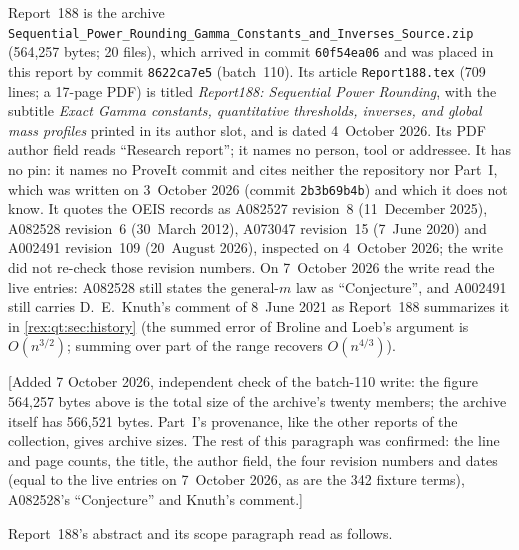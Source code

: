 Report~188 is the archive
\nolinkurl{Sequential_Power_Rounding_Gamma_Constants_and_Inverses_Source.zip}
(564,257 bytes; 20 files), which arrived in commit \texttt{60f54ea06} and
was placed in this report by commit \texttt{8622ca7e5} (batch~110). Its
article \texttt{Report188.tex} (709 lines; a 17-page PDF) is titled
\emph{Report188: Sequential Power Rounding}, with the subtitle
\emph{Exact Gamma constants, quantitative thresholds, inverses, and global
mass profiles} printed in its author slot, and is dated 4~October 2026. Its
PDF author field reads ``Research report''; it names no person, tool or
addressee. It has no pin: it names no ProveIt commit and cites neither the
repository nor Part~I, which was written on 3~October 2026 (commit
\texttt{2b3b69b4b}) and which it does not know. It quotes the OEIS records
as A082527 revision~8 (11~December 2025), A082528 revision~6
(30~March 2012), A073047 revision~15 (7~June 2020) and A002491
revision~109 (20~August 2026), inspected on 4~October 2026; the write
did not re-check those revision numbers. On 7~October 2026 the write read
the live entries: A082528 still states the general-$m$ law as
``Conjecture'', and A002491 still carries D.~E.~Knuth's comment of
8~June 2021 as Report~188 summarizes it in \cref{rex:qt:sec:history} (the
summed error of Broline and Loeb's argument is $O(n^{3/2})$; summing over
part of the range recovers $O(n^{4/3})$).

[Added 7 October 2026, independent check of the batch-110 write: the
figure 564,257 bytes above is the total size of the archive's twenty
members; the archive itself has 566,521 bytes. Part~I's provenance, like
the other reports of the collection, gives archive sizes. The rest of
this paragraph was confirmed: the line and page counts, the title, the
author field, the four revision numbers and dates (equal to the live
entries on 7~October 2026, as are the 342 fixture terms), A082528's
``Conjecture'' and Knuth's comment.]

Report~188's abstract and its scope paragraph read as follows.

